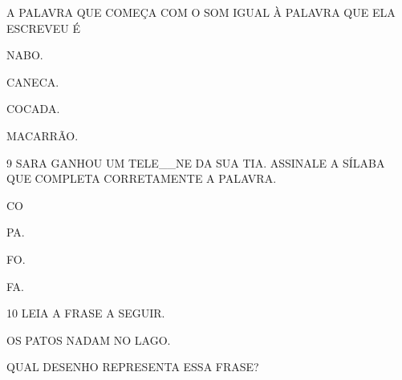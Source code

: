 A PALAVRA QUE COMEÇA COM O SOM IGUAL À PALAVRA QUE ELA ESCREVEU É 

\begin{escolha}
\item NABO.

\item CANECA.

\item COCADA.

\item MACARRÃO.
\end{escolha}

\coment{}

\num{9} SARA GANHOU UM TELE\_\_NE DA SUA TIA. ASSINALE A SÍLABA QUE COMPLETA CORRETAMENTE A PALAVRA.

\begin{escolha}
\item CO

\item PA.

\item FO.

\item FA.
\end{escolha}

\num{10} LEIA A FRASE A SEGUIR.

\begin{mdframed}[linewidth=2pt,linecolor=azul!20,backgroundcolor=azul!20,roundcorner=2pt]
OS PATOS NADAM NO LAGO.
\end{mdframed}

QUAL DESENHO REPRESENTA ESSA FRASE?

